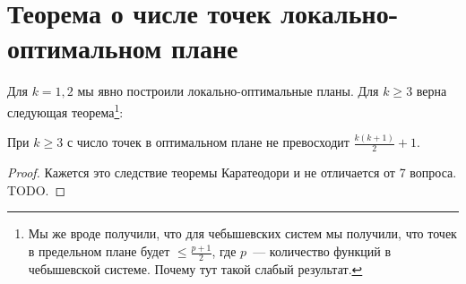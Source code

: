 \section{Теорема о числе точек локально-оптимальном плане}

Для $k=1,2$ мы явно построили локально-оптимальные планы. Для $k\geq 3$ верна следующая теорема\footnote{Мы же вроде получили, что для чебышевских систем мы получили, что точек в предельном плане будет $\leq \frac{p+1}{2}$, где $p$ — количество функций в чебышевской системе. Почему тут такой слабый результат.}:

\begin{thm}
При $k \geq 3$ с число точек в оптимальном плане не превосходит $\frac{k(k+1)}{2}+1$.
\end{thm}
 
 \begin{proof}
     Кажется это следствие теоремы Каратеодори и не отличается от 7 вопроса.{\color{blue} TODO}. 
 \end{proof}

